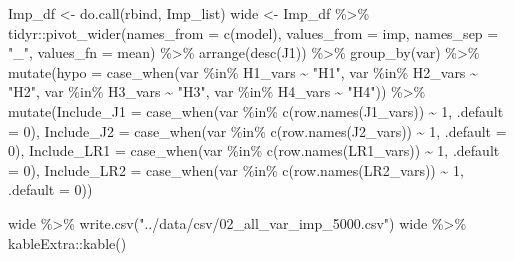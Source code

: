 \documentclass[
  letterpaper,
  DIV=11,
  numbers=noendperiod]{scrreprt}
\newenvironment{Shaded}{\begin{snugshade}}{\end{snugshade}}
\newcommand{\AttributeTok}[1]{\textcolor[rgb]{0.40,0.45,0.13}{#1}}
\newcommand{\DecValTok}[1]{\textcolor[rgb]{0.68,0.00,0.00}{#1}}
\newcommand{\FunctionTok}[1]{\textcolor[rgb]{0.28,0.35,0.67}{#1}}
\newcommand{\NormalTok}[1]{\textcolor[rgb]{0.00,0.23,0.31}{#1}}
\newcommand{\OtherTok}[1]{\textcolor[rgb]{0.00,0.23,0.31}{#1}}
\newcommand{\SpecialCharTok}[1]{\textcolor[rgb]{0.37,0.37,0.37}{#1}}
\newcommand{\StringTok}[1]{\textcolor[rgb]{0.13,0.47,0.30}{#1}}
\begin{document}
\begin{Shaded}
\begin{Highlighting}[]
\NormalTok{Imp\_df }\OtherTok{\textless{}{-}} \FunctionTok{do.call}\NormalTok{(rbind, Imp\_list)}
\NormalTok{wide }\OtherTok{\textless{}{-}}\NormalTok{ Imp\_df }\SpecialCharTok{\%\textgreater{}\%}
\NormalTok{  tidyr}\SpecialCharTok{::}\FunctionTok{pivot\_wider}\NormalTok{(}\AttributeTok{names\_from =} \FunctionTok{c}\NormalTok{(model), }
                     \AttributeTok{values\_from =}\NormalTok{ imp, }\AttributeTok{names\_sep =} \StringTok{"\_"}\NormalTok{, }
                     \AttributeTok{values\_fn =}\NormalTok{ mean) }\SpecialCharTok{\%\textgreater{}\%} 
  \FunctionTok{arrange}\NormalTok{(}\FunctionTok{desc}\NormalTok{(J1)) }\SpecialCharTok{\%\textgreater{}\%} 
  \FunctionTok{group\_by}\NormalTok{(var) }\SpecialCharTok{\%\textgreater{}\%}  
  \FunctionTok{mutate}\NormalTok{(}\AttributeTok{hypo =} \FunctionTok{case\_when}\NormalTok{(var }\SpecialCharTok{\%in\%}\NormalTok{ H1\_vars }\SpecialCharTok{\textasciitilde{}} \StringTok{"H1"}\NormalTok{,}
\NormalTok{                          var }\SpecialCharTok{\%in\%}\NormalTok{ H2\_vars }\SpecialCharTok{\textasciitilde{}} \StringTok{"H2"}\NormalTok{,}
\NormalTok{                          var }\SpecialCharTok{\%in\%}\NormalTok{ H3\_vars }\SpecialCharTok{\textasciitilde{}} \StringTok{"H3"}\NormalTok{,}
\NormalTok{                          var }\SpecialCharTok{\%in\%}\NormalTok{ H4\_vars }\SpecialCharTok{\textasciitilde{}} \StringTok{"H4"}\NormalTok{)) }\SpecialCharTok{\%\textgreater{}\%}
  \FunctionTok{mutate}\NormalTok{(}\AttributeTok{Include\_J1 =} \FunctionTok{case\_when}\NormalTok{(var }\SpecialCharTok{\%in\%} \FunctionTok{c}\NormalTok{(}\FunctionTok{row.names}\NormalTok{(J1\_vars)) }\SpecialCharTok{\textasciitilde{}} \DecValTok{1}\NormalTok{, }
         \AttributeTok{.default =} \DecValTok{0}\NormalTok{), }
         \AttributeTok{Include\_J2 =} \FunctionTok{case\_when}\NormalTok{(var }\SpecialCharTok{\%in\%} \FunctionTok{c}\NormalTok{(}\FunctionTok{row.names}\NormalTok{(J2\_vars)) }\SpecialCharTok{\textasciitilde{}} \DecValTok{1}\NormalTok{, }
         \AttributeTok{.default =} \DecValTok{0}\NormalTok{),}
         \AttributeTok{Include\_LR1 =} \FunctionTok{case\_when}\NormalTok{(var }\SpecialCharTok{\%in\%} \FunctionTok{c}\NormalTok{(}\FunctionTok{row.names}\NormalTok{(LR1\_vars)) }\SpecialCharTok{\textasciitilde{}} \DecValTok{1}\NormalTok{, }
         \AttributeTok{.default =} \DecValTok{0}\NormalTok{),}
         \AttributeTok{Include\_LR2 =} \FunctionTok{case\_when}\NormalTok{(var }\SpecialCharTok{\%in\%} \FunctionTok{c}\NormalTok{(}\FunctionTok{row.names}\NormalTok{(LR2\_vars)) }\SpecialCharTok{\textasciitilde{}} \DecValTok{1}\NormalTok{, }
         \AttributeTok{.default =} \DecValTok{0}\NormalTok{))}

\NormalTok{wide }\SpecialCharTok{\%\textgreater{}\%} \FunctionTok{write.csv}\NormalTok{(}\StringTok{"../data/csv/02\_all\_var\_imp\_5000.csv"}\NormalTok{)}
\NormalTok{wide }\SpecialCharTok{\%\textgreater{}\%}\NormalTok{ kableExtra}\SpecialCharTok{::}\FunctionTok{kable}\NormalTok{()}
\end{Highlighting}
\end{Shaded}
\end{document}
